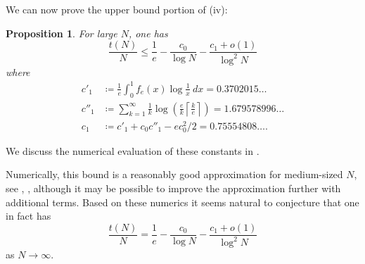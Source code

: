 \documentclass[12pt,a4paper,reqno]{amsart}
\numberwithin{equation}{section}
\theoremstyle{plain}
\newtheorem{proposition}[theorem]{Proposition}
\theoremstyle{definition}
\begin{document}
We can now prove the upper bound portion of (iv):

  \begin{proposition}\label{upper-bound}  For large $N$, one has
    $$ \frac{t(N)}{N} \leq \frac{1}{e} - \frac{c_0}{\log N} - \frac{c_1 + o(1)}{\log^2 N}$$
    where
    \begin{align}
      c'_1 &\coloneqq \frac{1}{e} \int_0^1 f_e(x) \log \frac{1}{x}\ dx = 0.3702015\dots \label{c1p-def}\\
      c''_1 &\coloneqq \sum_{k=1}^\infty \frac{1}{k}  \log\left( \frac{e}{k} \left\lceil \frac{k}{e} \right\rceil \right) = 1.679578996\dots\label{c1pp-def}\\
      c_1 &\coloneqq c'_1 + c_0 c''_1 - ec_0^2/2 =0.75554808\dots.\label{c1-def}
    \end{align}
  \end{proposition}

We discuss the numerical evaluation of these constants in .

  Numerically, this bound is a reasonably good approximation for medium-sized $N$, see , , although it may be possible to improve the approximation further with additional terms.  Based on these numerics it seems natural to conjecture that one in fact has
  $$\frac{t(N)}{N} = \frac{1}{e} - \frac{c_0}{\log N} - \frac{c_1 + o(1)}{\log^2 N}$$
as $N \to \infty$.
    
\end{document}
